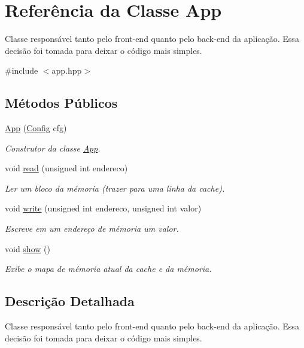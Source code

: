 \hypertarget{classApp}{}\section{Referência da Classe App}
\label{classApp}


Classe responsável tanto pelo front-\/end quanto pelo back-\/end da aplicação. Essa decisão foi tomada para deixar o código mais simples.  




{\ttfamily \#include $<$app.\+hpp$>$}

\subsection*{Métodos Públicos}
\begin{DoxyCompactItemize}
\item 
\hyperlink{classApp_a9035c72be7a12b46180e6d45b87436ee}{App} (\hyperlink{structConfig}{Config} cfg)
\begin{DoxyCompactList}\small\item\em Construtor da classe \hyperlink{classApp}{App}. \end{DoxyCompactList}\item 
void \hyperlink{classApp_ade8467361fe8300a45ee03433a5da7be}{read} (unsigned int endereco)
\begin{DoxyCompactList}\small\item\em Ler um bloco da mémoria (trazer para uma linha da cache). \end{DoxyCompactList}\item 
void \hyperlink{classApp_ab72f344e7a9f4113c8624bdb2cfd16ee}{write} (unsigned int endereco, unsigned int valor)
\begin{DoxyCompactList}\small\item\em Escreve em um endereço de mémoria um valor. \end{DoxyCompactList}\item 
\mbox{\label{classApp_aa4c457ebcb748c398fa044140514188c}} 
void \hyperlink{classApp_aa4c457ebcb748c398fa044140514188c}{show} ()
\begin{DoxyCompactList}\small\item\em Exibe o mapa de mémoria atual da cache e da mémoria. \end{DoxyCompactList}\end{DoxyCompactItemize}


\subsection{Descrição Detalhada}
Classe responsável tanto pelo front-\/end quanto pelo back-\/end da aplicação. Essa decisão foi tomada para deixar o código mais simples. 

